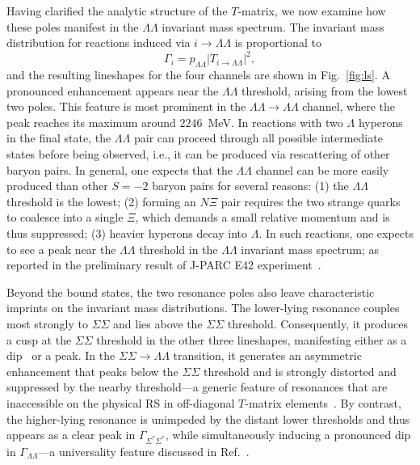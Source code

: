 \documentclass[prl,showpacs,twocolumn,superscriptaddress,floatfix,10pt,footinbib]{revtex4-2}
\begin{document}
Having clarified the analytic structure of the $T$-matrix, we now examine how these poles manifest in the $\Lambda\Lambda$ invariant mass spectrum. The invariant mass distribution for reactions induced via $i \to \Lambda\Lambda$ is proportional to
\begin{equation}
\Gamma_i=p_{\Lambda\Lambda}\left|T_{i\to\Lambda\Lambda}\right|^2,
\end{equation}
and the resulting lineshapes for the four channels are shown in Fig.~\ref{fig:ls}. A pronounced enhancement appears near the $\Lambda\Lambda$ threshold, arising from the lowest two poles. This feature is most prominent in the $\Lambda\Lambda \to \Lambda\Lambda$ channel, where the peak reaches its maximum around $2246$~MeV. In reactions with two $\Lambda$ hyperons in the final state, the $\Lambda\Lambda$ pair can proceed through all possible intermediate states before being observed, i.e., it can be produced via rescattering of other baryon pairs. In general, one expects that the $\Lambda\Lambda$ channel can be more easily produced than other $S=-2$ baryon pairs for several reasons: (1) the $\Lambda\Lambda$ threshold is the lowest; (2) forming an $N\Xi$ pair requires the two strange quarks to coalesce into a single $\Xi$, which demands a small relative momentum and is thus suppressed; (3) heavier hyperons decay into $\Lambda$. In such reactions, one expects to see a peak near the $\Lambda\Lambda$ threshold in the $\Lambda\Lambda$ invariant mass spectrum; as reported in the preliminary result of J-PARC E42 experiment~\cite{Ahn:2025exotic}.

Beyond the bound states, the two resonance poles also leave characteristic imprints on the invariant mass distributions. The lower-lying resonance couples most strongly to $\Sigma\Sigma$ and lies above the $\Sigma\Sigma$ threshold. Consequently, it produces a cusp at the $\Sigma\Sigma$ threshold in the other three lineshapes, manifesting either as a dip~\cite{Dong:2020hxe} or a peak. In the $\Sigma\Sigma\to\Lambda\Lambda$ transition, it generates an asymmetric enhancement that peaks below the $\Sigma\Sigma$ threshold and is strongly distorted and suppressed by the nearby threshold---a generic feature of resonances that are inaccessible on the physical RS in off-diagonal $T$-matrix elements~\cite{Zhang:2024qkg}. By contrast, the higher-lying resonance is unimpeded by the distant lower thresholds and thus appears as a clear peak in $\Gamma_{\Sigma^*\Sigma^*}$, while simultaneously inducing a pronounced dip in $\Gamma_{\Lambda\Lambda}$---a universality feature discussed in Ref.~\cite{Dong:2020hxe}.
\end{document}
